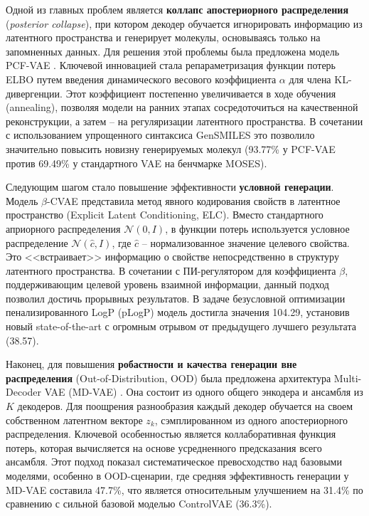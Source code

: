 Одной из главных проблем является \textbf{коллапс апостериорного распределения} (\textit{posterior collapse}), при котором декодер обучается игнорировать информацию из латентного пространства и генерирует молекулы, основываясь только на запомненных данных. Для решения этой проблемы была предложена модель PCF-VAE \cite{bhadwal2025pcf}. Ключевой инновацией стала репараметризация функции потерь ELBO путем введения динамического весового коэффициента $\alpha$ для члена KL-дивергенции. Этот коэффициент постепенно увеличивается в ходе обучения (annealing), позволяя модели на ранних этапах сосредоточиться на качественной реконструкции, а затем -- на регуляризации латентного пространства. В сочетании с использованием упрощенного синтаксиса GenSMILES это позволило значительно повысить новизну генерируемых молекул (93.77\% у PCF-VAE против 69.49\% у стандартного VAE на бенчмарке MOSES).

Следующим шагом стало повышение эффективности \textbf{условной генерации}. Модель $\beta$-CVAE \cite{richards2022conditional} представила метод явного кодирования свойств в латентное пространство (Explicit Latent Conditioning, ELC). Вместо стандартного априорного распределения $\mathcal{N}(0, I)$, в функции потерь используется условное распределение $\mathcal{N}(\hat{c}, I)$, где $\hat{c}$ -- нормализованное значение целевого свойства. Это <<встраивает>> информацию о свойстве непосредственно в структуру латентного пространства. В сочетании с ПИ-регулятором для коэффициента $\beta$, поддерживающим целевой уровень взаимной информации, данный подход позволил достичь прорывных результатов. В задаче безусловной оптимизации пенализированного LogP (pLogP) модель достигла значения 104.29, установив новый state-of-the-art с огромным отрывом от предыдущего лучшего результата (38.57).

Наконец, для повышения \textbf{робастности и качества генерации вне распределения} (Out-of-Distribution, OOD) была предложена архитектура Multi-Decoder VAE (MD-VAE) \cite{kwon2023string}. Она состоит из одного общего энкодера и ансамбля из $K$ декодеров. Для поощрения разнообразия каждый декодер обучается на своем собственном латентном векторе $z_k$, сэмплированном из одного апостериорного распределения. Ключевой особенностью является коллаборативная функция потерь, которая вычисляется на основе усредненного предсказания всего ансамбля. Этот подход показал систематическое превосходство над базовыми моделями, особенно в OOD-сценарии, где средняя эффективность генерации у MD-VAE составила 47.7\%, что является относительным улучшением на 31.4\% по сравнению с сильной базовой моделью ControlVAE (36.3\%).

